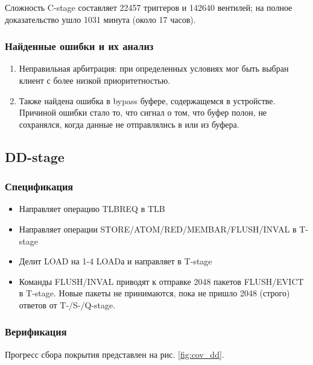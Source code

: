 Сложность C-stage составляет 22457 триггеров и 142640 вентилей; на полное доказательство ушло 1031 минута (около 17 часов).

\subsubsection*{Найденные ошибки и их анализ}

\begin{enumerate}
    \item Неправильная арбитрация: при определенных условиях мог быть выбран клиент с более низкой приоритетностью.  %
    \item Также найдена ошибка в bypass буфере, содержащемся в устройстве. Причиной ошибки стало то, что сигнал о том, что буфер полон, не сохранялся, когда данные не отправлялись в или из буфера. %
\end{enumerate}

\subsection{DD-stage}

\subsubsection*{Спецификация}

\begin{itemize}
    \item Направляет операцию TLBREQ в TLB
    \item Направляет операции STORE/ATOM/RED/MEMBAR/FLUSH/INVAL в T-stage
    \item Делит LOAD на 1-4 LOADа и направляет в T-stage 
    \item Команды FLUSH/INVAL приводят к отправке 2048 пакетов FLUSH/EVICT в T-stage. Новые пакеты не принимаются, пока не пришло 2048 (строго) ответов от T-/S-/Q-stage.
\end{itemize}

\subsubsection*{Верификация}

\tab Прогресс сбора покрытия представлен на рис. \ref{fig:cov_dd}.

